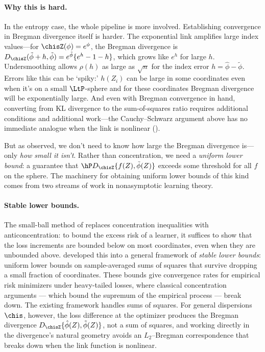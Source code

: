 \documentclass{article}
\begin{document}
\paragraph{Why this is hard.}
In the entropy case,
the whole pipeline is more involved.
Establishing convergence
in Bregman divergence itself is harder.
The exponential link amplifies
large index values---for
$\chisZ(\phi) = e^\phi$,
the Bregman divergence is
$D_{\chisZ}(\tilde\phi+h, \tilde\phi) = e^{\tilde\phi}\{e^{h} - 1 - h\}$,
which grows like $e^h$ for large $h$.
Undersmoothing allows
$\rho(h)$ as large as $\sqrt{n}$
for the index error $h = \hat\phi - \tilde\phi$.
Errors like this can be `spiky:'
$h(Z_i)$ can be large in some coordinates
even when it's on a small $\LtP$-sphere
and for these coordinates Bregman divergence will be exponentially large.
And even with Bregman convergence in hand,
converting from KL divergence
to the sum-of-squares ratio
requires additional conditions and additional work---the
Cauchy--Schwarz argument above
has no immediate analogue when the link is nonlinear
().

But as \citet{mendelson2015learning} observed,
we don't need to know
how large the Bregman divergence is---only
\emph{how small it isn't}.
Rather than concentration,
we need a \emph{uniform lower bound}:
a guarantee that
$\hP D_{\chisZ}\{f(Z), \tilde\phi(Z)\}$
exceeds some threshold
for all $f$ on the sphere.
The machinery for obtaining
uniform lower bounds of this kind
comes from two streams of work
in nonasymptotic learning theory.

\paragraph{Stable lower bounds.}
The small-ball method
of \citet{mendelson2015learning}
replaces concentration inequalities
with anticoncentration:
to bound the excess risk of a learner,
it suffices to show that
the loss increments are bounded below
on most coordinates,
even when they are unbounded above.
\citet{mendelson2021extending}
developed this into a general framework
of \emph{stable lower bounds}:
uniform lower bounds
on sample-averaged sums of squares
that survive dropping
a small fraction of coordinates.
These bounds give convergence rates
for empirical risk minimizers
under heavy-tailed losses,
where classical concentration arguments
--- which bound the supremum
of the empirical process ---
break down.
The existing framework handles sums of squares.
For general dispersions $\chis$, however,
the loss difference at the optimizer
produces the Bregman divergence
$D_{\chisZ}\{\hat\phi(Z), \tilde\phi(Z)\}$,
not a sum of squares,
and working directly
in the divergence's natural geometry
avoids an $L_2$--Bregman correspondence
that breaks down
when the link function is nonlinear.
\end{document}
